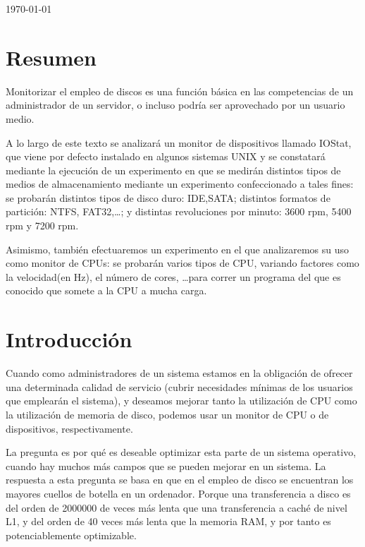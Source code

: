 \documentclass[a4paper,10pt]{article}
\newcommand{\imagent}[4]{
  \begin{figure}
    \begin{center}
    \texttt{[image: \#1]}
    \end{center}
    \caption{#3}
    \label{#4}
  \end{figure}
}
\newcommand{\imagen}[4]{
  \begin{minipage}{\linewidth}
    \centering
    \texttt{[image: \#1]}
    \captionof{figure}{#2}
    \label{#3}
  \end{minipage} 
}
\renewcommand{\texttt}[2][black!60]{\textcolor{#1}{\ttfamily #2}}
\begin{document}
\begin{titlepage}
\vspace{\fill}%
\large\today
\end{titlepage}  

\newpage
\thispagestyle{empty}
\tableofcontents
\newpage
\setcounter{page}{1}


\section{Resumen}
Monitorizar el empleo de discos es una función básica en las competencias de un administrador de un servidor, o incluso
podría ser aprovechado por un usuario medio.

A lo largo de este texto se analizará un monitor de dispositivos llamado \texttt{IOStat}, que viene por defecto instalado
en algunos sistemas UNIX y se constatará mediante la ejecución de un experimento en que se medirán distintos tipos de medios 
de almacenamiento mediante un experimento confeccionado a tales fines: se probarán distintos tipos de disco
duro: IDE,SATA; distintos formatos de partición: NTFS, FAT32,\ldots; y distintas revoluciones por minuto: 3600 rpm, 5400 rpm y 7200 rpm.

Asimismo, también efectuaremos un experimento en el que analizaremos su uso como monitor de CPUs: se probarán varios
tipos de CPU, variando factores como la velocidad(en Hz), el número de cores, \ldots para correr un programa del que es
conocido que somete a la CPU a mucha carga.
\section{Introducción}
Cuando como administradores de un sistema estamos en la obligación de ofrecer una determinada calidad de servicio (cubrir
necesidades mínimas de los usuarios que emplearán el sistema), y deseamos mejorar tanto la utilización de CPU como la utilización de 
memoria de disco, podemos usar un monitor de CPU o de dispositivos, respectivamente.

La pregunta es por qué es deseable optimizar esta parte de un sistema operativo, cuando hay muchos más campos que se pueden
mejorar en un sistema. La respuesta a esta pregunta se basa en que en el empleo de disco se encuentran los mayores cuellos de
botella en un ordenador. Porque una transferencia a  disco es del orden de 2000000 de veces más lenta que una transferencia a
caché de nivel L1, y del orden de 40 veces más lenta que la memoria RAM, y por tanto es potenciablemente optimizable. \cite{conferencia}
\end{document}
